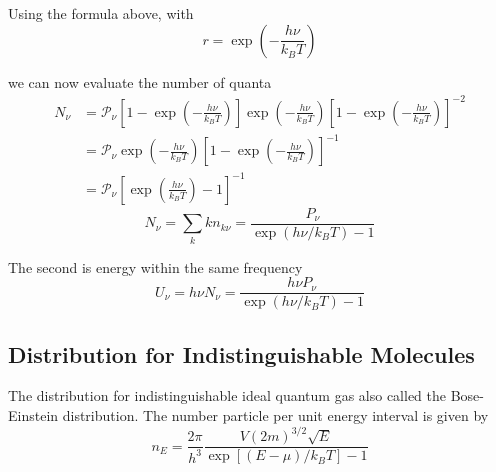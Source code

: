 \documentclass[../../../Main.tex]{subfiles}
\begin{document}
Using the formula above, with 
\begin{equation*}
    r=\exp\left(-\frac{h\nu}{k_BT}\right)
\end{equation*}

we can now evaluate the number of quanta
\begin{align*}
    N_\nu&=\mathcal{P}_\nu\left[1-\exp\left(-\frac{h\nu}{k_BT}\right) \right]\exp\left(-\frac{h\nu}{k_BT}\right)\left[1-\exp\left(-\frac{h\nu}{k_BT}\right)\right]^{-2}\\
    &=\mathcal{P}_\nu\exp\left(-\frac{h\nu}{k_BT}\right)\left[1-\exp\left(-\frac{h\nu}{k_BT}\right)\right]^{-1}\\
    &=\mathcal{P}_\nu\left[\exp\left(\frac{h\nu}{k_BT}\right)-1 \right]^{-1}
\end{align*}
\begin{equation*}
    N_\nu=\sum_k kn_{k\nu}=\frac{P_\nu}{\exp(h\nu/k_BT)-1}
\end{equation*}

The second is energy within the same frequency
\begin{equation*}
    U_\nu=h\nu N_\nu =\frac{h\nu P_\nu}{\exp(h\nu/k_BT)-1}
\end{equation*}

\subsection*{Distribution for Indistinguishable Molecules}
The distribution for indistinguishable ideal quantum gas also called the Bose-Einstein distribution. The number particle per unit energy interval is given by 
\begin{equation*}
    n_E=\frac{2\pi}{h^3} \frac{V (2m)^{3/2}\sqrt{E}}{\exp\left[(E-\mu)/k_BT\right]-1}
\end{equation*}
\end{document}
